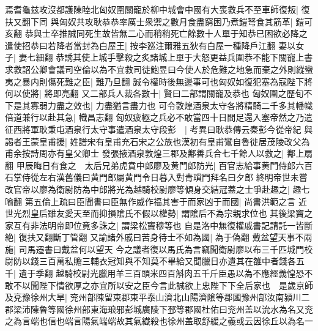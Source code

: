 焉耆龜兹攻沒都護陳睦北匈奴圍關寵於柳中城會中國有大喪救兵不至車師復叛|{
	復扶又翻下同}
與匈奴共攻耿恭恭率厲士衆禦之數月食盡窮困乃煮鎧弩食其筋革|{
	鎧可亥翻}
恭與士卒推誠同死生故皆無二心而稍稍死亡餘數十人單于知恭已困欲必降之遣使招恭曰若降者當封為白屋王|{
	按李廵注爾雅五狄有白屋一種降戶江翻}
妻以女子|{
	妻七細翻}
恭誘其使上城手擊殺之炙諸城上單于大怒更益兵圍恭不能下關寵上書求救詔公卿會議司空倫以為不宜救司徒鮑昱曰今使人於危難之地急而棄之外則縱蠻夷之暴内則傷死難之臣|{
	難乃旦翻}
誠令權時後無邊事可也匈奴如復犯塞為寇陛下將何以使將|{
	將即亮翻}
又二部兵人裁各數十|{
	賢曰二部謂關寵及恭也}
匈奴圍之歷旬不下是其寡弱力盡之效也|{
	力盡猶言盡力也}
可令敦煌酒泉太守各將精騎二千多其幡幟倍道兼行以赴其急|{
	幟昌志翻}
匈奴疲極之兵必不敢當四十日間足還入塞帝然之乃遣征西將軍耿秉屯酒泉行太守事遣酒泉太守段彭　|{
	考異曰耿恭傳云秦彭今從帝紀}
與謁者王蒙皇甫援|{
	姓譜宋有皇甫充石宋之公族也漢初有皇甫鸞自魯徙居茂陵改父為甫余按詩周亦有皇父卿士}
發張掖酒泉敦煌三郡及鄯善兵合七千餘人以救之|{
	鄯上扇翻}
甲辰晦日有食之　太后兄弟虎賁中郎廖及黄門郎防光|{
	百官志給事黄門侍郎六百石掌侍從左右漢舊儀曰黄門郎屬黄門令日暮入對青瑣門拜名曰夕郎}
終明帝世未嘗改官帝以廖為衛尉防為中郎將光為越騎校尉廖等傾身交結冠蓋之士爭赴趣之|{
	趣七喻翻}
第五倫上疏曰臣聞書曰臣無作威作福其害于而家凶于而國|{
	尚書洪範之言}
近世光烈皇后雖友愛天至而抑損隂氏不假以權勢|{
	謂隂后不為宗親求位也}
其後梁竇之家互有非法明帝即位竟多誅之|{
	謂梁松竇穆等也}
自是洛中無復權戚書記請託一皆斷絶|{
	復扶又翻斷丁管翻}
又諭諸外戚曰苦身待士不如為國|{
	為于偽翻}
戴盆望天事不兩施|{
	司馬遷書曰戴盆何以望天}
今之議者復以馬氏為言竊聞衛尉廖以布三千匹城門校尉防以錢三百萬私贍三輔衣冠知與不知莫不畢給又聞臘日亦遺其在雒中者錢各五千|{
	遺于季翻}
越騎校尉光臘用羊三百頭米四百斛肉五千斤臣愚以為不應經義惶恐不敢不以聞陛下情欲厚之亦宜所以安之臣今言此誠欲上忠陛下下全后家也　是歲京師及兗豫徐州大旱|{
	兖州部陳留東郡東平泰山濟北山陽濟隂等郡國豫州部汝南潁川二郡梁沛陳魯等國徐州部東海琅邪彭城廣陵下邳等郡國杜佑曰兖州盖以沇水為名又兖之為言端也信也端言陽氣端端故其氣纎殺也徐州盖取舒緩之義或云因徐丘以為名一}


